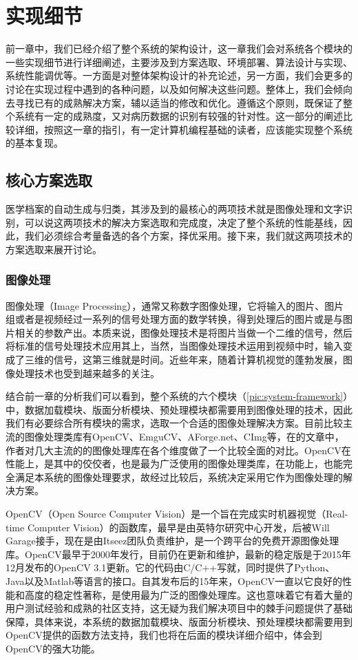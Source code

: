 \chapter{实现细节}
\label{chap:implements}
前一章中，我们已经介绍了整个系统的架构设计，这一章我们会对系统各个模块的一些实现细节进行详细阐述，主要涉及到方案选取、环境部署、算法设计与实现、系统性能调优等。一方面是对整体架构设计的补充论述，另一方面，我们会更多的讨论在实现过程中遇到的各种问题，以及如何解决这些问题。整体上，我们会倾向去寻找已有的成熟解决方案，辅以适当的修改和优化。遵循这个原则，既保证了整个系统有一定的成熟度，又对病历数据的识别有较强的针对性。这一部分的阐述比较详细，按照这一章的指引，有一定计算机编程基础的读者，应该能实现整个系统的基本复现。

\section{核心方案选取}
医学档案的自动生成与归类，其涉及到的最核心的两项技术就是图像处理和文字识别，可以说这两项技术的解决方案选取和完成度，决定了整个系统的性能基线，因此，我们必须综合考量备选的各个方案，择优采用。接下来，我们就这两项技术的方案选取来展开讨论。

\subsection{图像处理}
图像处理（Image Processing），通常又称数字图像处理，它将输入的图片、图片组或者是视频经过一系列的信号处理方面的数学转换，得到处理后的图片或是与图片相关的参数产出\citep{gonzalez2008digital}。本质来说，图像处理技术是将图片当做一个二维的信号，然后将标准的信号处理技术应用其上，当然，当图像处理技术运用到视频中时，输入变成了三维的信号，这第三维就是时间。近些年来，随着计算机视觉的蓬勃发展，图像处理技术也受到越来越多的关注。

结合前一章的分析我们可以看到，整个系统的六个模块（\autoref{pic:system-framework}）中，数据加载模块、版面分析模块、预处理模块都需要用到图像处理的技术，因此我们有必要综合所有模块的需求，选取一个合适的图像处理解决方案。目前比较主流的图像处理类库有OpenCV\citep{bradski2008OpenCV}、EmguCV\citep{Shi013emgu}、AForge.net\citep{Kirillov2013Aforge}、CImg\citep{tschumperle2012cimg}等，在\citep{XianrongWang}的文章中，作者对几大主流的的图像处理库在各个维度做了一个比较全面的对比。OpenCV在性能上，是其中的佼佼者，也是最为广泛使用的图像处理类库，在功能上，也能完全满足本系统的图像处理要求，故经过比较后，系统决定采用它作为图像处理的解决方案。

OpenCV（Open Source Computer Vision）是一个旨在完成实时机器视觉（Real-time Computer Vision）的函数库，最早是由英特尔研究中心开发，后被Will Garage接手，现在是由Itseez团队负责维护，是一个跨平台的免费开源图像处理库\citep{wiki:OpenCV}。OpenCV最早于2000年发行，目前仍在更新和维护，最新的稳定版是于2015年12月发布的OpenCV 3.1更新。它的代码由C/C++写就，同时提供了Python、Java以及Matlab等语言的接口\citep{wiki:OpenCV}。自其发布后的15年来，OpenCV一直以它良好的性能和高度的稳定性著称，是使用最为广泛的图像处理库。这也意味着它有着大量的用户测试经验和成熟的社区支持，这无疑为我们解决项目中的棘手问题提供了基础保障，具体来说，本系统的数据加载模块、版面分析模块、预处理模块都需要用到OpenCV提供的函数方法支持，我们也将在后面的模块详细介绍中，体会到OpenCV的强大功能。


